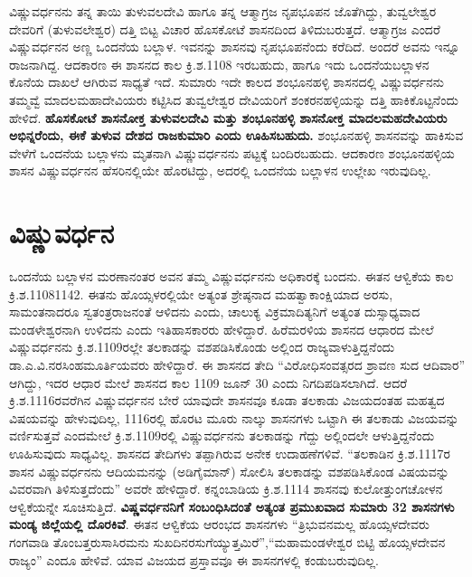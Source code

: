 ವಿಷ್ಣುವರ್ಧನನು ತನ್ನ ತಾಯಿ ತುಳುವಲದೇವಿ ಹಾಗೂ ತನ್ನ ಆತ್ಮಾಗ್ರಜ ನೃಪಭೂಪನ ಜೊತೆಗಿದ್ದು, ತುವ್ವಲೇಶ್ವರ ದೇವರಿಗೆ (ತುಳುವಲೇಶ್ವರ) ದತ್ತಿ ಬಿಟ್ಟ ವಿಚಾರ ಹೊಸಕೋಟೆ ಶಾಸನದಿಂದ ತಿಳಿದುಬರುತ್ತದೆ. ಆತ್ಮಾಗ್ರಜ ಎಂದರೆ ವಿಷ್ಣುವರ್ಧನನ ಅಣ್ಣ ಒಂದನೆಯ ಬಲ್ಲಾಳ. ಇವನನ್ನು ಶಾಸನವು ನೃಪಭೂಪನೆಂದು ಕರೆದಿದೆ. ಅಂದರೆ ಅವನು ಇನ್ನೂ ರಾಜನಾಗಿದ್ದ. ಆದಕಾರಣ ಈ ಶಾಸನದ ಕಾಲ ಕ್ರಿ.ಶ.1108 ಇರಬಹುದು, ಹಾಗೂ ಇದು ಒಂದನೆಯಬಲ್ಲಾಳನ ಕೊನೆಯ ದಾಖಲೆ ಆಗಿರುವ ಸಾಧ್ಯತೆ ಇದೆ. ಸುಮಾರು ಇದೇ ಕಾಲದ ಶಂಭೂನಹಳ್ಳಿ ಶಾಸನದಲ್ಲಿ ವಿಷ್ಣುವರ್ಧನನು ತಮ್ಮವ್ವೆ ಮಾದಲಮಹಾದೇವಿಯರು ಕಟ್ಟಿಸಿದ ತುವ್ವಲೇಶ್ವರ ದೇವಿಯರಿಗೆ ಶಂಕರನಹಳ್ಳಿಯನ್ನು ದತ್ತಿ ಹಾಕಿಕೊಟ್ಟನೆಂದು ಹೇಳಿದೆ. \textbf{ಹೊಸಕೋಟೆ ಶಾಸನೋಕ್ತ ತುಳುವಲದೇವಿ ಮತ್ತು ಶಂಭೂನಹಳ್ಳಿ ಶಾಸನೋಕ್ತ ಮಾದಲಮಹದೇವಿಯರು ಅಭಿನ್ನರೆಂದು, ಈಕೆ ತುಳುವ ದೇಶದ ರಾಜಕುಮಾರಿ ಎಂದು ಊಹಿಸಬಹುದು.} ಶಂಭೂನಹಳ್ಳಿ ಶಾಸನವನ್ನು ಹಾಕಿಸುವ ವೇಳೆಗೆ ಒಂದನೆಯ ಬಲ್ಲಾಳನು ಮೃತನಾಗಿ ವಿಷ್ಣುವರ್ಧನನು ಪಟ್ಟಕ್ಕೆ ಬಂದಿರಬಹುದು. ಆದಕಾರಣ ಶಂಭೂನಹಳ್ಳಿಯ ಶಾಸನ ವಿಷ್ಣುವರ್ಧನನ ಹೆಸರಿನಲ್ಲಿಯೇ ಹೊರಟಿದ್ದು, ಅದರಲ್ಲಿ ಒಂದನೆಯ ಬಲ್ಲಾಳನ ಉಲ್ಲೇಖ ಇರುವುದಿಲ್ಲ.


\section{ವಿಷ್ಣುವರ್ಧನ}

ಒಂದನೆಯ ಬಲ್ಲಾಳನ ಮರಣಾನಂತರ ಅವನ ತಮ್ಮ ವಿಷ್ಣುವರ್ಧನನು ಅಧಿಕಾರಕ್ಕೆ ಬಂದನು. ಈತನ ಆಳ್ವಿಕೆಯ ಕಾಲ ಕ್ರಿ.ಶ.11081142. ಈತನು ಹೊಯ್ಸಳರಲ್ಲಿಯೇ ಅತ್ಯಂತ ಶ್ರೇಷ್ಠನಾದ ಮಹತ್ವಾಕಾಂಕ್ಷಿಯಾದ ಅರಸು, ಸಾಮಂತನಾದರೂ ಸ್ವತಂತ್ರರಾಜನಂತೆ ಆಳಿದನು ಎಂದು, ಚಾಲುಕ್ಯ ವಿಕ್ರಮಾದಿತ್ಯನಿಗೆ ಅತ್ಯಂತ ದುಸ್ಸಾಧ್ಯವಾದ ಮಂಡಳೇಶ್ವರನಾಗಿ ಉಳಿದನು ಎಂದು ಇತಿಹಾಸಕಾರರು ಹೇಳಿದ್ದಾರೆ. ಹಿರೆಮರಳಿಯ ಶಾಸನದ ಆಧಾರದ ಮೇಲೆ ವಿಷ್ಣುವರ್ಧನನು ಕ್ರಿ.ಶ.1109ರಲ್ಲೇ ತಲಕಾಡನ್ನು ವಶಪಡಿಸಿಕೊಂಡು ಅಲ್ಲಿಂದ ರಾಜ್ಯವಾಳುತ್ತಿದ್ದನೆಂದು ಡಾ.ಎ.ವಿ.ನರಸಿಂಹಮೂರ್ತಿಯವರು ಹೇಳಿದ್ದಾರೆ. ಈ ಶಾಸನದ ತೇದಿ “ವಿರೋಧಿಸಂವತ್ಸರದ ಶ್ರಾವಣ ಸುದ ಆದಿವಾರ” ಆಗಿದ್ದು, ಇದರ ಆಧಾರ ಮೇಲೆ ಶಾಸನದ ಕಾಲ 1109 ಜೂನ್​ 30 ಎಂದು ನಿಗದಿಪಡಿಸಲಾಗಿದೆ. ಆದರೆ ಕ್ರಿ.ಶ.1116ರವರೆಗಿನ ವಿಷ್ಣುವರ್ಧನನ ಬೇರೆ ಯಾವುದೇ ಶಾಸನವೂ ಕೂಡಾ ತಲಕಾಡು ವಿಜಯದಂತಹ ಮಹತ್ವದ ವಿಷಯವನ್ನು ಹೇಳುವುದಿಲ್ಲ, 1116ರಲ್ಲಿ ಹೊರಟ ಮೂರು ನಾಲ್ಕು ಶಾಸನಗಳು ಒಟ್ಟಾಗಿ ಈ ತಲಕಾಡು ವಿಜಯವನ್ನು ವರ್ಣಿಸುತ್ತವೆ ಎಂದಮೇಲೆ ಕ್ರಿ.ಶ.1109ರಲ್ಲಿ ವಿಷ್ಣುವರ್ಧನನು ತಲಕಾಡನ್ನು ಗೆದ್ದು ಅಲ್ಲಿಂದಲೇ ಆಳುತ್ತಿದ್ದನೆಂದು ಊಹಿಸುವುದು ಸಾಧ್ಯವಿಲ್ಲ. ಶಾಸನದ ತೇದಿಗಳು ತಪ್ಪಾಗಿರುವ ಅನೇಕ ಉದಾಹಣೆಗಳಿವೆ. “ತಲಕಾಡಿನ ಕ್ರಿ.ಶ.1117ರ ಶಾಸನ ವಿಷ್ಣುವರ್ಧನನು ಆದಿಯಮನನ್ನು (ಅಡಿಗೈಮಾನ್​) ಸೋಲಿಸಿ ತಲಕಾಡನ್ನು ವಶಪಡಿಸಿಕೊಂಡ ವಿಷಯವನ್ನು ವಿವರವಾಗಿ ತಿಳಿಸುತ್ತದೆಂದು” ಅವರೇ ಹೇಳಿದ್ದಾರೆ. ಕನ್ನಂಬಾಡಿಯ ಕ್ರಿ.ಶ.1114 ಶಾಸನವು ಕುಲೋತ್ತುಂಗಚೋಳನ ಆಳ್ವಿಕೆಯನ್ನೇ ಸೂಚಿಸುತ್ತಿದೆ. \textbf{ವಿಷ್ಣವರ್ಧನನಿಗೆ ಸಂಬಂಧಿಸಿದಂತೆ ಅತ್ಯಂತ ಪ್ರಮುಖವಾದ ಸುಮಾರು 32 ಶಾಸನಗಳು ಮಂಡ್ಯ ಜಿಲ್ಲೆಯಲ್ಲಿ ದೊರಕಿವೆ}. ಈತನ ಆಳ್ವಿಕೆಯ ಆರಂಭದ ಶಾಸನಗಳು “ತ್ರಿಭುವನಮಲ್ಲ ಹೊಯ್ಸಳದೇವರು ಗಂಗವಾಡಿ ತೊಂಬತ್ತರುಸಾಸಿರಮನು ಸುಖದಿನರಸುಗೆಯ್ಯುತ್ತಮಿರೆ”,\break “ಮಹಾಮಂಡಳೇಶ್ವರ ಬಿಟ್ಟಿ ಹೊಯ್ಸಳದೇವನ ರಾಜ್ಯಂ” ಎಂದೂ ಹೇಳಿವೆ. ಯಾವ ವಿಜಯದ ಪ್ರಸ್ತಾವವೂ ಈ ಶಾಸನಗಳಲ್ಲಿ ಕಂಡುಬರುವುದಿಲ್ಲ. 

